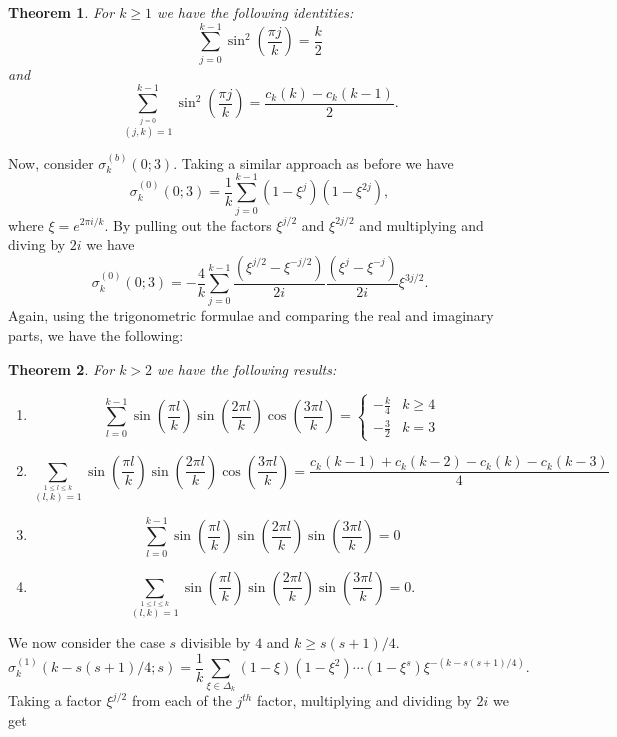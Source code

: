 \documentclass[12pt]{article}
\newtheorem{thm}{Theorem}[subsection]%
\begin{document}
\begin{thm} For $k\geq 1$ we have the following identities: 
$$
\sum_{j=0}^{k-1} \sin^{2}\left(\frac{\pi j}{k}\right)=\frac{k}{2}
$$
and 
$$
\sum_{\stackrel{j=0}{(j,k)=1}}^{k-1} \sin^{2}\left(\frac{\pi j}{k}\right) = \frac{c_{k}(k)-c_{k}(k-1)}{2}.
$$ 
\end{thm}

Now, consider $\sigma_{k}^{(b)}(0;3)$. Taking a similar approach as before we have 
$$
\sigma_{k}^{(0)}(0;3)=\frac{1}{k}\sum_{j=0}^{k-1}(1-\xi^{j})(1-\xi^{2j}),
$$
where $\xi=e^{2\pi i/k}$. By pulling out the factors $\xi^{j/2}$ and $\xi^{2j/2}$ and multiplying and diving by $2i$ we have 
$$
\sigma_{k}^{(0)}(0;3)=-\frac{4}{k}\sum_{j=0}^{k-1}\frac{(\xi^{j/2}-\xi^{-j/2})}{2i}\frac{(\xi^{j}-\xi^{-j})}{2i}\xi^{3j/2}.
$$
Again, using the trigonometric formulae and comparing the real and imaginary parts, we have the following:

\begin{thm} For $k>2$ we have the following results:

\begin{enumerate}
    \item $$
\sum_{l=0}^{k-1}\sin\left(\frac{\pi l}{k}\right)\sin\left(\frac{2\pi l}{k}\right)\cos\left(\frac{3\pi l}{k}\right) = \left\{\begin{matrix}
    -\frac{k}{4} & k\geq 4 \\
    -\frac{3}{2} & k=3
\end{matrix}\right.
$$

\item 
$$
\sum_{\stackrel{1\leq l\leq k}{(l,k)=1}}\sin\left(\frac{\pi l}{k}\right)\sin\left(\frac{2\pi l}{k}\right)\cos\left(\frac{3\pi l}{k}\right) =\frac{c_{k}(k-1)+c_{k}(k-2)-c_{k}(k)-c_{k}(k-3)}{4}
$$

\item 
$$
\sum_{l=0}^{k-1}\sin\left(\frac{\pi l}{k}\right)\sin\left(\frac{2\pi l}{k}\right)\sin\left(\frac{3\pi l}{k}\right) =0
$$
\item 
$$
\sum_{\stackrel{1\leq l\leq k}{(l,k)=1}}\sin\left(\frac{\pi l}{k}\right)\sin\left(\frac{2\pi l}{k}\right)\sin\left(\frac{3\pi l}{k}\right)=0.
$$
\end{enumerate}
  
\end{thm}

We now consider the case $s$ divisible by $4$ and $k\geq s(s+1)/4$. 
$$
\sigma^{(1)}_{k}(k-s(s+1)/4;s) = \frac{1}{k}\sum_{\xi \in \Delta_{k}} (1-\xi)(1-\xi^{2})\cdots (1-\xi^{s})\xi^{-(k-s(s+1)/4)}.
$$
Taking a factor $\xi^{j/2}$ from each of the $j^{th}$ factor, multiplying and dividing by $2i$ we get 
\end{document}

